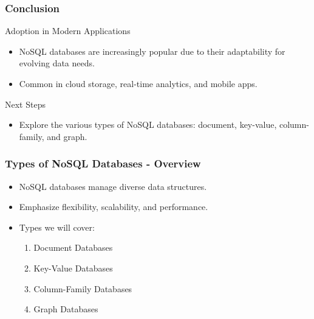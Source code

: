 \documentclass[aspectratio=169]{beamer}
\begin{document}
\begin{frame}[fragile]
    \frametitle{Conclusion}
    \begin{block}{Adoption in Modern Applications}
        \begin{itemize}
            \item NoSQL databases are increasingly popular due to their adaptability for evolving data needs.
            \item Common in cloud storage, real-time analytics, and mobile apps.
        \end{itemize}
    \end{block}
    
    \begin{block}{Next Steps}
        \begin{itemize}
            \item Explore the various types of NoSQL databases: document, key-value, column-family, and graph.
        \end{itemize}
    \end{block}
\end{frame}

\begin{frame}[fragile]
    \frametitle{Types of NoSQL Databases - Overview}
    \begin{itemize}
        \item NoSQL databases manage diverse data structures.
        \item Emphasize flexibility, scalability, and performance.
        \item Types we will cover:
        \begin{enumerate}
            \item Document Databases
            \item Key-Value Databases
            \item Column-Family Databases
            \item Graph Databases
        \end{enumerate}
    \end{itemize}
\end{frame}
\end{document}
